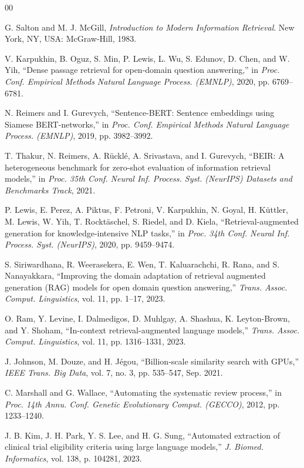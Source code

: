 \documentclass[conference]{IEEEtran}
\begin{document}
\begin{thebibliography}{00}

G. Salton and M. J. McGill, \textit{Introduction to Modern Information
Retrieval}. New York, NY, USA: McGraw-Hill, 1983.

V. Karpukhin, B. Oguz, S. Min, P. Lewis, L. Wu, S. Edunov, D. Chen, and
W. Yih, ``Dense passage retrieval for open-domain question answering,''
in \textit{Proc. Conf. Empirical Methods Natural Language Process. (EMNLP)},
2020, pp. 6769--6781.

N. Reimers and I. Gurevych, ``Sentence-BERT: Sentence embeddings using
Siamese BERT-networks,'' in \textit{Proc. Conf. Empirical Methods Natural
Language Process. (EMNLP)}, 2019, pp. 3982--3992.

T. Thakur, N. Reimers, A. Rücklé, A. Srivastava, and I. Gurevych, ``BEIR:
A heterogeneous benchmark for zero-shot evaluation of information retrieval
models,'' in \textit{Proc. 35th Conf. Neural Inf. Process. Syst. (NeurIPS)
Datasets and Benchmarks Track}, 2021.

P. Lewis, E. Perez, A. Piktus, F. Petroni, V. Karpukhin, N. Goyal,
H. Küttler, M. Lewis, W. Yih, T. Rocktäschel, S. Riedel, and D. Kiela,
``Retrieval-augmented generation for knowledge-intensive NLP tasks,'' in
\textit{Proc. 34th Conf. Neural Inf. Process. Syst. (NeurIPS)}, 2020,
pp. 9459--9474.

S. Siriwardhana, R. Weerasekera, E. Wen, T. Kaluarachchi, R. Rana, and
S. Nanayakkara, ``Improving the domain adaptation of retrieval augmented
generation (RAG) models for open domain question answering,''
\textit{Trans. Assoc. Comput. Linguistics}, vol. 11, pp. 1--17, 2023.

O. Ram, Y. Levine, I. Dalmedigos, D. Muhlgay, A. Shashua, K. Leyton-Brown,
and Y. Shoham, ``In-context retrieval-augmented language models,''
\textit{Trans. Assoc. Comput. Linguistics}, vol. 11, pp. 1316--1331, 2023.

J. Johnson, M. Douze, and H. Jégou, ``Billion-scale similarity search with
GPUs,'' \textit{IEEE Trans. Big Data}, vol. 7, no. 3, pp. 535--547,
Sep. 2021.

C. Marshall and G. Wallace, ``Automating the systematic review process,''
in \textit{Proc. 14th Annu. Conf. Genetic Evolutionary Comput. (GECCO)},
2012, pp. 1233--1240.

J. B. Kim, J. H. Park, Y. S. Lee, and H. G. Sung, ``Automated extraction
of clinical trial eligibility criteria using large language models,''
\textit{J. Biomed. Informatics}, vol. 138, p. 104281, 2023.


\end{thebibliography}
\end{document}
